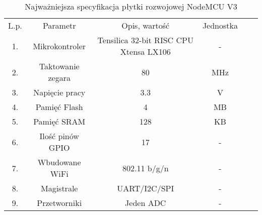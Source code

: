 \begin{table}[H]
\centering
\caption{Najważniejsza specyfikacja płytki rozwojowej NodeMCU V3 \cite{ESP_param}}
\label{tab:1}
\begin{tabular}{|c|c|c|c|ll}
\cline{1-4}
\cellcolor[HTML]{C0C0C0}L.p. & \cellcolor[HTML]{C0C0C0}Parametr          & \cellcolor[HTML]{C0C0C0}Opis, wartość                          & \cellcolor[HTML]{C0C0C0}Jednostka &  &  \\ \cline{1-4}
\cellcolor[HTML]{EFEFEF}1.   & \cellcolor[HTML]{EFEFEF}Mikrokontroler    & \cellcolor[HTML]{EFEFEF}Tensilica 32-bit RISC CPU Xtensa LX106 & \cellcolor[HTML]{EFEFEF}-         &  &  \\ \cline{1-4}
\cellcolor[HTML]{C0C0C0}2.   & \cellcolor[HTML]{C0C0C0}Taktowanie zegara & \cellcolor[HTML]{C0C0C0}80                                     & \cellcolor[HTML]{C0C0C0}MHz       &  &  \\ \cline{1-4}
\cellcolor[HTML]{EFEFEF}3.   & \cellcolor[HTML]{EFEFEF}Napięcie pracy    & \cellcolor[HTML]{EFEFEF}3.3                                    & \cellcolor[HTML]{EFEFEF}V         &  &  \\ \cline{1-4}
\cellcolor[HTML]{C0C0C0}4.   & \cellcolor[HTML]{C0C0C0}Pamięć Flash      & \cellcolor[HTML]{C0C0C0}4                                      & \cellcolor[HTML]{C0C0C0}MB        &  &  \\ \cline{1-4}
\cellcolor[HTML]{EFEFEF}5.   & \cellcolor[HTML]{EFEFEF}Pamięć SRAM       & \cellcolor[HTML]{EFEFEF}128                                    & \cellcolor[HTML]{EFEFEF}KB        &  &  \\ \cline{1-4}
\cellcolor[HTML]{C0C0C0}6.   & \cellcolor[HTML]{C0C0C0}Ilość pinów GPIO  & \cellcolor[HTML]{C0C0C0}17                                     & \cellcolor[HTML]{C0C0C0}-         &  &  \\ \cline{1-4}
\cellcolor[HTML]{EFEFEF}7.   & \cellcolor[HTML]{EFEFEF}Wbudowane WiFi    & \cellcolor[HTML]{EFEFEF}802.11 b/g/n                           & \cellcolor[HTML]{EFEFEF}-         &  &  \\ \cline{1-4}
\cellcolor[HTML]{C0C0C0}8.   & \cellcolor[HTML]{C0C0C0}Magistrale        & \cellcolor[HTML]{C0C0C0}UART/I2C/SPI                           & \cellcolor[HTML]{C0C0C0}-         &  &  \\ \cline{1-4}
\cellcolor[HTML]{EFEFEF}9.   & \cellcolor[HTML]{EFEFEF}Przetworniki      & \cellcolor[HTML]{EFEFEF}Jeden ADC                              & \cellcolor[HTML]{EFEFEF}-         &  &  \\ \cline{1-4}
\end{tabular}
\end{table}

